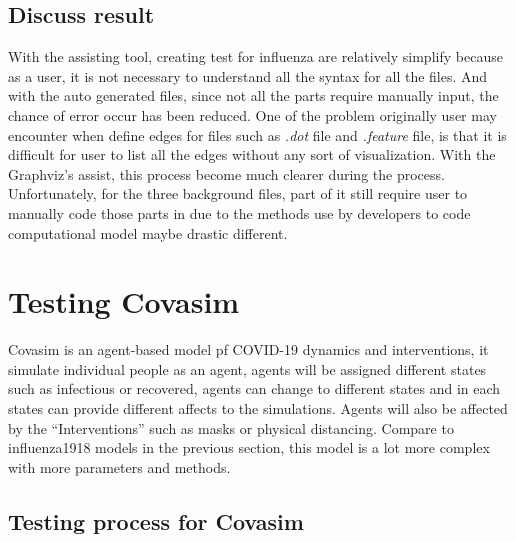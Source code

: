 \subsection{Discuss result}
With the assisting tool, creating test for influenza are relatively simplify because as a user, it is not necessary to understand all the syntax for all the files. And with the auto generated files, since not all the parts require manually input, the chance of error occur has been reduced. One of the problem originally user may encounter when define edges for files such as \textsl{.dot} file and \textsl{.feature} file, is that it is difficult for user to list all the edges without any sort of visualization. With the Graphviz’s assist, this process become much clearer during the process. Unfortunately, for the three background files, part of it still require user to manually code those parts in due to the methods use by developers to code computational model maybe drastic different.

\section{Testing Covasim}
Covasim is an agent-based model pf COVID-19 dynamics and interventions, it simulate individual people as an agent, agents will be assigned different states such as infectious or recovered, agents can change to different states and in each states can provide different affects to the simulations. Agents will also be affected by the “Interventions” such as masks or physical distancing. Compare to influenza1918 models in the previous section, this model is a lot more complex with more parameters and methods. 
\subsection{Testing process for Covasim}





